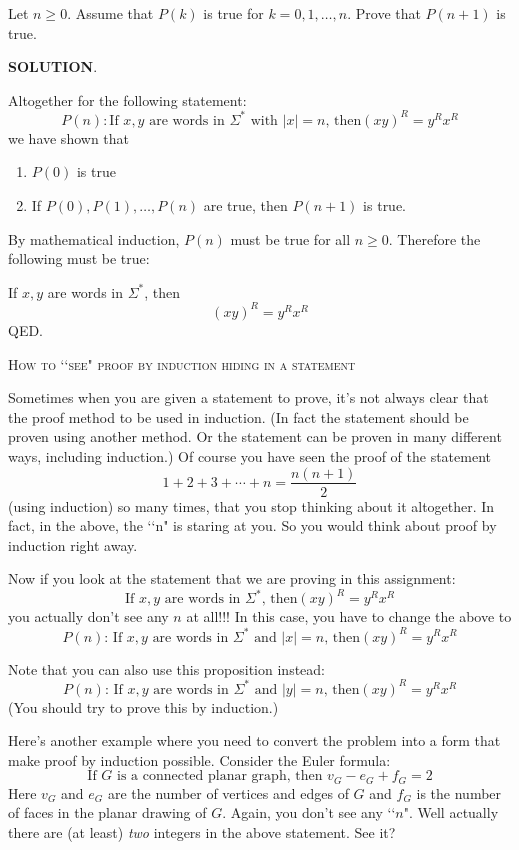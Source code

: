 Let $n \geq 0$.
Assume that $P(k)$ is true for $k = 0, 1, \ldots, n$.
Prove that $P(n+1)$ is true.

\textbf{SOLUTION}.




\newpage
Altogether for the following statement:
\[
P(n): 
\text{
If $x,y$ are words in $\Sigma^*$ with $|x| = n$, then
$(xy)^R = y^R x^R$
}
\]
we have shown that
\begin{enumerate}
\item $P(0)$ is true
\item If $P(0), P(1), \ldots, P(n)$ are true, then $P(n+1)$ is true.
\end{enumerate}
By mathematical induction, $P(n)$ must be true for all $n \geq 0$.
Therefore the following must be true:

If $x,y$ are words in $\Sigma^*$, then
\[
(xy)^R = y^R x^R
\]
QED.




\newpage
\textsc{How to \lq\lq see" proof by induction hiding in a statement}

Sometimes when you are given a statement to prove, it's not always clear that
the proof method to be used in induction. (In fact the statement should be
proven using another method. Or the statement can be proven in many different
ways, including induction.) Of course you have seen the proof of the statement
\[
1 + 2 + 3 + \cdots + n = \frac{n(n+1)}{2}
\]
(using induction) so many times, that you stop thinking about it altogether.
In fact, in the above, the \lq\lq n" is staring at you. So you would think
about proof by induction right away.

Now if you look at the statement that we are proving in this assignment:
\[
\text{
If $x,y$ are words in $\Sigma^*$, then
$(xy)^R = y^R x^R$
}
\]
you actually don't see any $n$ at all!!!
In this case, you have to change the above to
\[
\text{
$P(n)$: \  
If $x,y$ are words in $\Sigma^*$ and $|x|=n$, then
$(xy)^R = y^R x^R$
}
\]


Note that you can also use this proposition instead:
\[
\text{
$P(n)$: \  
If $x,y$ are words in $\Sigma^*$ and $|y|=n$, then
$(xy)^R = y^R x^R$
}
\]
(You should try to prove this by induction.)

Here's another example where you need to convert the problem into a form
that make proof by induction possible.
Consider the Euler formula:
\[
\text{If $G$ is a connected planar graph, then $v_G - e_G + f_G = 2$}
\]
Here $v_G$ and $e_G$ are the number of vertices and edges of $G$
and $f_G$ is the number of faces in the planar drawing of $G$.
Again, you don't see any \lq\lq$n$".
Well actually there are (at least) \textit{two} integers in the above
statement. See it?

